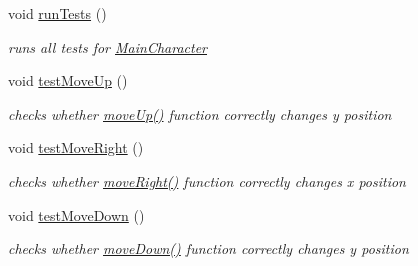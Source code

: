 \begin{DoxyCompactItemize}
\mbox{\label{classRose_1_1Character_1_1MainCharacter_a1411e3f7d908bc8861440364cda0a799}} 
void \mbox{\hyperlink{classRose_1_1Character_1_1MainCharacter_a1411e3f7d908bc8861440364cda0a799}{run\+Tests}} ()
\begin{DoxyCompactList}\small\item\em runs all tests for \mbox{\hyperlink{classRose_1_1Character_1_1MainCharacter}{Main\+Character}} \end{DoxyCompactList}\item 
\mbox{\label{classRose_1_1Character_1_1MainCharacter_a060fdf08288fc7e3480e25e6215bd235}} 
void \mbox{\hyperlink{classRose_1_1Character_1_1MainCharacter_a060fdf08288fc7e3480e25e6215bd235}{test\+Move\+Up}} ()
\begin{DoxyCompactList}\small\item\em checks whether \mbox{\hyperlink{classRose_1_1Character_1_1MainCharacter_a9f967f5ad98eaae08948ab65bfd1a90b}{move\+Up()}} function correctly changes y position \end{DoxyCompactList}\item 
\mbox{\label{classRose_1_1Character_1_1MainCharacter_a7576ae77bf69b08f288710a5699464f5}} 
void \mbox{\hyperlink{classRose_1_1Character_1_1MainCharacter_a7576ae77bf69b08f288710a5699464f5}{test\+Move\+Right}} ()
\begin{DoxyCompactList}\small\item\em checks whether \mbox{\hyperlink{classRose_1_1Character_1_1MainCharacter_a08b5eae4f7ccabe74d1764993b0dcf91}{move\+Right()}} function correctly changes x position \end{DoxyCompactList}\item 
\mbox{\label{classRose_1_1Character_1_1MainCharacter_a9aa179b0818808c5a7c6366204bd1362}} 
void \mbox{\hyperlink{classRose_1_1Character_1_1MainCharacter_a9aa179b0818808c5a7c6366204bd1362}{test\+Move\+Down}} ()
\begin{DoxyCompactList}\small\item\em checks whether \mbox{\hyperlink{classRose_1_1Character_1_1MainCharacter_ac6a35f90921775e254bbb723998e84cd}{move\+Down()}} function correctly changes y position \end{DoxyCompactList}\item 

\end{DoxyCompactItemize}
